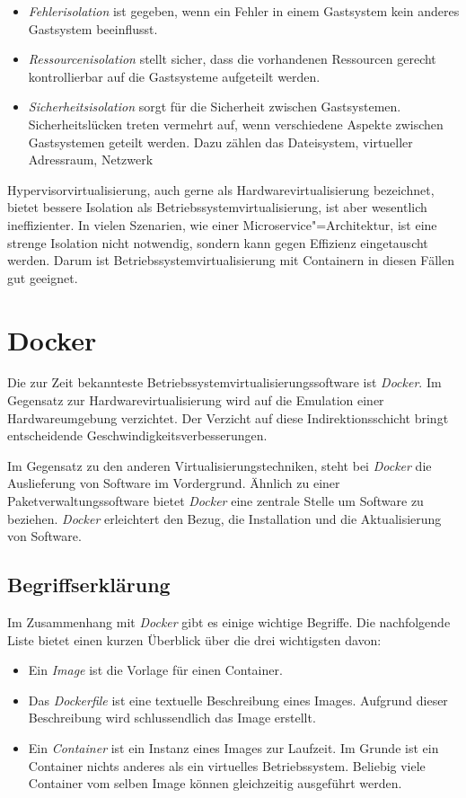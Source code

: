 \begin{itemize}
	\item \textit{Fehlerisolation} ist gegeben, wenn ein Fehler in einem Gastsystem kein anderes Gastsystem beeinflusst.
	\item \textit{Ressourcenisolation} stellt sicher, dass die vorhandenen Ressourcen gerecht \bzw kontrollierbar auf die Gastsysteme aufgeteilt werden.
	\item \textit{Sicherheitsisolation} sorgt für die Sicherheit zwischen Gastsystemen. Sicherheitslücken treten vermehrt auf, wenn verschiedene Aspekte zwischen Gastsystemen geteilt werden. Dazu zählen \zB das Dateisystem, virtueller Adressraum, Netzwerk \usw
\end{itemize}

Hypervisorvirtualisierung, auch gerne als Hardwarevirtualisierung bezeichnet, bietet bessere Isolation als Betriebssystemvirtualisierung, ist aber wesentlich ineffizienter. In vielen Szenarien, wie einer Microservice"=Architektur, ist eine strenge Isolation nicht notwendig, sondern kann gegen Effizienz eingetauscht werden. Darum ist Betriebssystemvirtualisierung mit Containern in diesen Fällen gut geeignet.

\section{Docker}

Die zur Zeit bekannteste Betriebssystemvirtualisierungssoftware ist \textit{Docker}. Im Gegensatz zur Hardwarevirtualisierung wird auf die Emulation einer Hardwareumgebung verzichtet. Der Verzicht auf diese Indirektionsschicht bringt entscheidende Geschwindigkeitsverbesserungen.

Im Gegensatz zu den anderen Virtualisierungstechniken, steht bei \textit{Docker} die Auslieferung von Software im Vordergrund. Ähnlich zu einer Paketverwaltungssoftware bietet \textit{Docker} eine zentrale Stelle um Software zu beziehen. \textit{Docker} erleichtert den Bezug, die Installation und die Aktualisierung von Software.

\subsection{Begriffserklärung}

Im Zusammenhang mit \textit{Docker} gibt es einige wichtige Begriffe. Die nachfolgende Liste bietet einen kurzen Überblick über die drei wichtigsten davon:

\begin{itemize}
	\item Ein \textit{Image} ist die Vorlage für einen Container.
	\item Das \textit{Dockerfile} ist eine textuelle Beschreibung eines Images. Aufgrund dieser Beschreibung wird schlussendlich das Image erstellt.
	\item Ein \textit{Container} ist ein Instanz eines Images zur Laufzeit. Im Grunde ist ein Container nichts anderes als ein virtuelles Betriebssystem. Beliebig viele Container vom selben Image können gleichzeitig ausgeführt werden.
\end{itemize}

